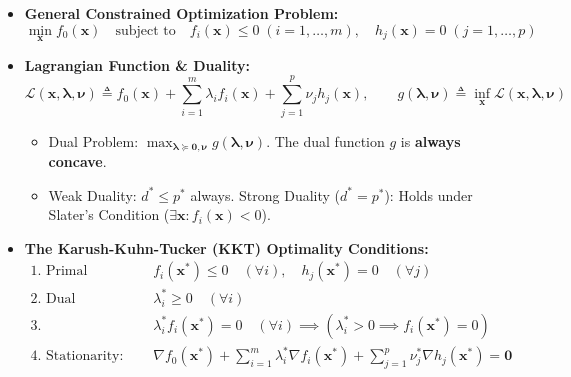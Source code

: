 \begin{tcolorbox}[breakable, colback=primarylight!30, colframe=primarydark, title={\large \textbf{5. Constrained Optimization, KKT \& Support Vector Machines (Weeks 9--10)}}]
\begin{itemize}[leftmargin=*, noitemsep, topsep=2pt]
    \item \textbf{General Constrained Optimization Problem:}
    \begin{equation*}
    \min_{\mathbf{x}} f_0(\mathbf{x}) \quad \text{subject to} \quad f_i(\mathbf{x}) \le 0 \; (i = 1, \dots, m), \quad h_j(\mathbf{x}) = 0 \; (j = 1, \dots, p)
    \end{equation*}
    \item \textbf{Lagrangian Function \& Duality:}
    \begin{equation*}
    \mathcal{L}(\mathbf{x}, \boldsymbol{\lambda}, \boldsymbol{\nu}) \triangleq f_0(\mathbf{x}) + \sum_{i=1}^m \lambda_i f_i(\mathbf{x}) + \sum_{j=1}^p \nu_j h_j(\mathbf{x}), \qquad g(\boldsymbol{\lambda}, \boldsymbol{\nu}) \triangleq \inf_{\mathbf{x}} \mathcal{L}(\mathbf{x}, \boldsymbol{\lambda}, \boldsymbol{\nu})
    \end{equation*}
    \begin{itemize}[leftmargin=*, noitemsep]
        \item Dual Problem: $\max_{\boldsymbol{\lambda} \succeq \mathbf{0}, \boldsymbol{\nu}} g(\boldsymbol{\lambda}, \boldsymbol{\nu})$. The dual function $g$ is \textbf{always concave}.
        \item Weak Duality: $d^* \le p^*$ always. Strong Duality ($d^* = p^*$): Holds under Slater's Condition ($\exists \mathbf{x} : f_i(\mathbf{x}) < 0$).
    \end{itemize}
    \item \textbf{The Karush-Kuhn-Tucker (KKT) Optimality Conditions:}
    \begin{align*}
    \text{1. Primal Feasibility:} \quad & f_i(\mathbf{x}^*) \le 0 \quad (\forall i), \quad h_j(\mathbf{x}^*) = 0 \quad (\forall j) \\
    \text{2. Dual Feasibility:} \quad & \lambda_i^* \ge 0 \quad (\forall i) \\
    \text{3. Complementary Slackness:} \quad & \lambda_i^* f_i(\mathbf{x}^*) = 0 \quad (\forall i) \implies (\lambda_i^* > 0 \implies f_i(\mathbf{x}^*) = 0) \\
    \text{4. Stationarity:} \quad & \nabla f_0(\mathbf{x}^*) + \sum_{i=1}^m \lambda_i^* \nabla f_i(\mathbf{x}^*) + \sum_{j=1}^p \nu_j^* \nabla h_j(\mathbf{x}^*) = \mathbf{0}

\end{align*}
\end{itemize}
\end{tcolorbox}
